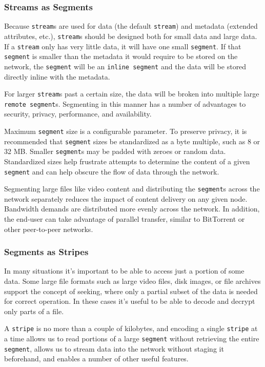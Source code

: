 \documentclass[a4paper,10pt]{article} \usepackage[utf8]{inputenc}
\newcommand{\x}[1]{{\tt #1}} \newcommand{\code}[1]{{\tt #1}}
\begin{document}
\subsubsection{Streams as Segments}

Because \x{stream}s are used for data (the default \x{stream}) and metadata
(extended attributes, etc.), \x{stream}s should be designed both for small data
and large data. If a \x{stream} only has very little data, it will have one
small \x{segment}. If that \x{segment} is smaller than the metadata it would
require to be stored on the network, the \x{segment} will be an \x{inline
segment} and the data will be stored directly inline with the metadata.

For larger \x{stream}s past a certain size, the data will be broken into
multiple large \x{remote segment}s. Segmenting in this manner has a number of
advantages to security, privacy, performance, and availability.

Maximum \x{segment} size is a configurable parameter. To preserve privacy, it is
recommended that \x{segment} sizes be standardized as a byte multiple, such as 8
or 32 MB. Smaller \x{segment}s may be padded with zeroes or random data.
Standardized sizes help frustrate attempts to determine the content of a given
\x{segment} and can help obscure the flow of data through the network.

Segmenting large files like video content and distributing the \x{segment}s
across the network separately reduces the impact of content delivery on any
given node. Bandwidth demands are distributed more evenly across the network. In
addition, the end-user can take advantage of parallel transfer, similar to
BitTorrent or other peer-to-peer networks.

\subsubsection{Segments as Stripes}

In many situations it's important to be able to access just a portion of some
data. Some large file formats such as large video files, disk images, or file
archives support the concept of seeking, where only a partial subset of the data
is needed for correct operation. In these cases it's useful to be able to decode
and decrypt only parts of a file.

A \x{stripe} is no more than a couple of kilobytes, and encoding a single
\x{stripe} at a time allows us to read portions of a large \x{segment}
without retrieving the entire \x{segment}, allows us to stream data into the
network without staging it beforehand, and enables a number of other useful
features.
\end{document}
